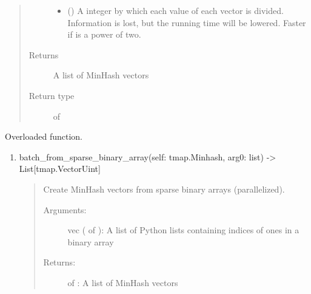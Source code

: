 \documentclass[letterpaper,10pt,english]{sphinxmanual}
\begin{document}
\begin{fulllineitems}
\begin{fulllineitems}
\begin{quote}
\begin{description}
\begin{itemize}
\item {} 
 () \textendash{} A integer by which each value of each vector is divided. Information is lost, but the running time will be lowered. Faster if  is a power of two.

\end{itemize}

\item[{Returns}] \leavevmode
A list of MinHash vectors

\item[{Return type}] \leavevmode
{} of 

\end{description}\end{quote}

\end{fulllineitems}


\begin{fulllineitems}
\label{\detokenize{documentation:tmap.Minhash.batch_from_sparse_binary_array}}
Overloaded function.
\begin{enumerate}
\def\theenumi{\arabic{enumi}}
\def\labelenumi{\theenumi .}
\makeatletter\def\p@enumii{\p@enumi \theenumi .}\makeatother
\item {} 
batch\_from\_sparse\_binary\_array(self: tmap.Minhash, arg0: list) -\textgreater{} List{[}tmap.VectorUint{]}
\begin{quote}

Create MinHash vectors from sparse binary arrays (parallelized).
\begin{description}
\item[{Arguments:}] \leavevmode
vec ( of ): A list of Python lists containing indices of ones in a binary array

\item[{Returns:}] \leavevmode
{} of : A list of MinHash vectors

\end{description}
\end{quote}


\end{enumerate}
\end{fulllineitems}
\end{fulllineitems}
\end{document}
